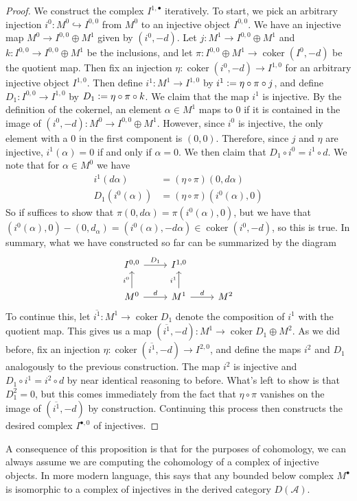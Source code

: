 \documentclass[psamsfonts, 12pt]{amsart}
\theoremstyle{definition}
\theoremstyle{remark}
\newcommand{\defeq}{\vcentcolon=}
\DeclareMathOperator{\coker}{coker}
\begin{document}
\begin{proof}
We construct the complex $I^{1,\bullet}$ iteratively. To start, we pick
an arbitrary injection $i^0 : M^0 \hookrightarrow  I^{0,0}$ from $M^0$ to an
injective object $I^{0,0}$. We have an injective map $M^0 \to I^{0,0} \oplus M^1$
given by $(i^0,-d)$. Let $j : M^1 \to I^{0,0} \oplus M^1$ and
$k : I^{0,0} \to I^{0,0} \oplus M^1$ be the inclusions, and let
$\pi : I^{0,0} \oplus M^1 \to \coker(I^0,-d)$ be the quotient map. Then fix
an injection $\eta : \coker(i^0,-d) \to I^{1,0}$ for an arbitrary injective object
$I^{1,0}$. Then define $i^1 : M^1 \to I^{1,0}$ by $i^1 \defeq \eta \circ \pi \circ j$,
and define $D_1 : I^{0,0} \to I^{1,0}$ by $D_1 \defeq \eta \circ \pi \circ k$.
We claim that the map $i^1$ is injective. By the definition of the cokernel,
an element $\alpha \in M^1$ maps to $0$ if it is contained in the image of
$(i^0,-d) : M^0 \to I^{0,0} \oplus M^1$. However, since $i^0$ is injective,
the only element with a $0$ in the first component is $(0,0)$. Therefore,
since $j$ and $\eta$ are injective, $i^1(\alpha) = 0$ if and only if $\alpha = 0$.
We then claim that $D_1 \circ i^0 = i^1 \circ d$. We note that for $\alpha \in M^0$
we have
\begin{align*}
i^1(d\alpha) &= (\eta \circ \pi)(0,d\alpha) \\
D_1(i^0(\alpha)) &= (\eta \circ \pi)(i^0(\alpha),0)
\end{align*}
So if suffices to show that $\pi(0,d\alpha) = \pi(i^0(\alpha),0)$, but we have that
$(i^0(\alpha),0) - (0,d_\alpha) = (i^0(\alpha),-d\alpha) \in \coker(i^0,-d)$, so
this is true. In summary, what we have constructed so far can be summarized by the
diagram
\[\begin{tikzcd}
I^{0,0} \ar[r, "D_1"] & I^{1,0} \\
M^0 \ar[u, "i^0"]\ar[r, "d"] & M^1 \ar[r, "d"] \ar[u, "i^1"]& M^2
\end{tikzcd}\]
To continue this, let $\overline{i^1} : M^1 \to \coker D_1$ denote the composition
of $i^1$ with the quotient map. This gives us a map
$(\overline{i^1},-d) : M^1 \to \coker D_1 \oplus M^2$. As we did before,
fix an injection $\eta : \coker(\overline{i^1},-d) \to I^{2,0}$, and define the
maps $i^2$ and $D_1$ analogously to the previous construction. The map $i^2$ is
injective and $D_1 \circ i^1 = i^2 \circ d$ by near identical reasoning to before.
What's left to show is that $D_1^2 = 0$, but this comes immediately from
the fact that $\eta \circ \pi$ vanishes on the image of $(\overline{i^1}, -d)$
by construction. Continuing this process then constructs the desired complex
$I^{\bullet,0}$ of injectives.
\end{proof}
%
A consequence of this proposition is that for the purposes of cohomology,
we can always assume we are computing the cohomology of a complex of injective
objects. In more modern language, this says that any bounded below complex $M^\bullet$
is isomorphic to a complex of injectives in the derived category $D(\mathcal{A})$. \\
\end{document}
